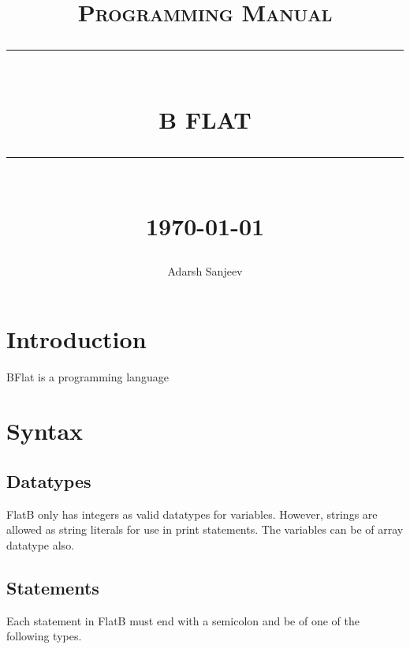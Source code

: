 \documentclass[12pt]{report}
\newcommand{\HRule}[1]{\rule{\linewidth}{#1}}
\begin{document}
\title{ \normalsize \textsc{Programming Manual}
		\\ [2.0cm]
		\HRule{0.5pt} \\
		\LARGE \textbf{\uppercase{B Flat}}
		\HRule{2pt} \\ [0.5cm]
		\normalsize \today \vspace*{5\baselineskip}}

\date{}

\author{ Adarsh Sanjeev }

\maketitle
\tableofcontents
\newpage

\sectionfont{\scshape}


\section*{Introduction}
BFlat is a programming language

\section*{Syntax}

\subsection*{Datatypes}

FlatB only has integers as valid datatypes for variables. However, strings are allowed as string literals for use in print statements.
The variables can be of array datatype also.

\subsection*{Statements}
Each statement in FlatB must end with a semicolon and be of one of the following types.
\end{document}
